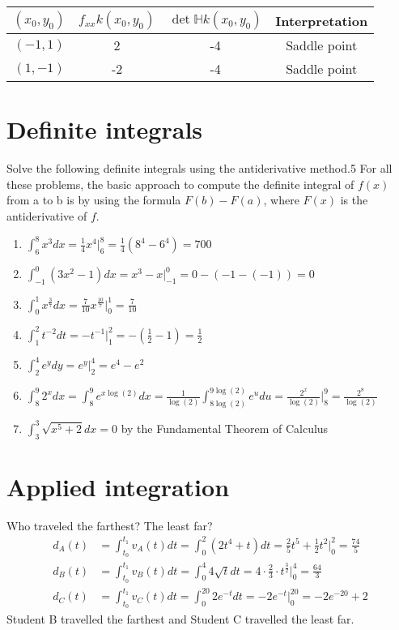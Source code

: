 \documentclass[12pt]{article}
\begin{document}
\begin{enumerate}
\begin{center}
\begin{tabular}{ c |c |c |c }
 $(x_0,y_0)$ & $f_{xx} k(x_0,y_0)$ & $\det \mathbb{H}k(x_0,y_0)$ & Interpretation
 \\  \hline \hline
 $(-1,1)$ &  2 &-4 & Saddle point\\  
 $(1,-1) $&  -2 & -4 & Saddle point
 \end{tabular}
\end{center}
\end{enumerate}

\section{Definite integrals}
Solve the following definite integrals using the antiderivative method.5
For all these problems, the basic approach to compute the definite integral of $f(x)$ from a to b is by using the
formula $F(b) - F(a)$, where $F(x)$ is the antiderivative of $f$.
\begin{enumerate}
    \item $\int_6^8 x^3 dx = \frac{1}{4}x^4 \bigg|_6^8  = \frac{1}{4}(8^4-6^4)=700$
    \item $\int_{-1}^0 (3x^2 -1) dx = x^3 -x \bigg|_{-1}^0= 0-(-1-(-1))=0$
    \item $\int_0^1 x^{\frac{3}{7}}dx = \frac{7}{10} x^{\frac{10}{7}} \bigg|_0^1 = \frac{7}{10}$
    \item $\int_1^2 t^{-2}dt = -t^{-1} \bigg|_1^2 = -(\frac{1}{2}-1) = \frac{1}{2}$
    \item $\int_2^4 e^y dy = e^y \bigg|_2^4 = e^4-e^2$
    \item $\int_8^9 2^x dx = \int_8^9 e^{x\log(2)} dx= \frac{1}{\log(2)}\int_{8\log(2)}^{9\log(2)}e^udu = \frac{2^x}{\log(2)}\bigg|_8^9 = \frac{2^8}{\log(2)}$
    \item $\int_3^3 \sqrt{x^5+2} dx=0$ by the Fundamental Theorem of Calculus
\end{enumerate}

\section{Applied integration}
Who traveled the farthest? The least far? 
\begin{align*}
    d_A(t) &= \int_{t_0}^{t_1} v_A(t) dt = \int_0^2 (2t^4+t)dt = \frac{2}{5}t^5 + \frac{1}{2}t^2 \bigg|_0^2 = \frac{74}{5}
    \\ d_B(t) &= \int_{t_0}^{t_1} v_B(t) dt = \int_0^4 4\sqrt{t}dt = 4\cdot \frac{2}{3} \cdot t^{\frac{3}{2}}\bigg|_0^4 = \frac{64}{3}
    \\  d_C(t) &= \int_{t_0}^{t_1} v_C(t) dt = \int_0^{20}2e^{-t}dt = -2e^{-t}\bigg|_0^{20} =  -2e^{-20}+2
\end{align*}
Student B travelled the farthest and Student C travelled the least far. 
\end{document}
